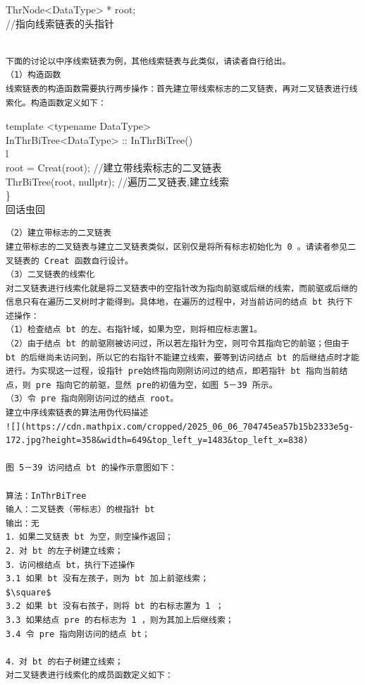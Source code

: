 \documentclass[10pt]{article}
\begin{document}
\begin{verbatim}

\end{verbatim}

ThrNode<DataType> * root;\\
//指向线索链表的头指针

\begin{verbatim}

下面的讨论以中序线索链表为例，其他线索链表与此类似，请读者自行给出。
（1）构造函数
线索链表的构造函数需要执行两步操作：首先建立带线索标志的二叉链表，再对二叉链表进行线索化。构造函数定义如下：
\end{verbatim}

template <typename DataType>\\
InThrBiTree<DataType> :: InThrBiTree()\\
l\\
root = Creat(root); //建立带线索标志的二叉链表\\
ThrBiTree(root, nullptr); //遍历二叉链表,建立线索\\
\}\\
回话虫回

\begin{verbatim}
（2）建立带标志的二叉链表
建立带标志的二叉链表与建立二叉链表类似，区别仅是将所有标志初始化为 0 。请读者参见二叉链表的 Creat 函数自行设计。
（3）二叉链表的线索化
对二叉链表进行线索化就是将二叉链表中的空指针改为指向前驱或后继的线索，而前驱或后继的信息只有在遍历二叉树时才能得到。具体地，在遍历的过程中，对当前访问的结点 bt 执行下述操作：
（1）检查结点 bt 的左、右指针域，如果为空，则将相应标志置1。
（2）由于结点 bt 的前驱刚被访问过，所以若左指针为空，则可令其指向它的前驱；但由于 bt 的后继尚未访问到，所以它的右指针不能建立线索，要等到访问结点 bt 的后继结点时才能进行。为实现这一过程，设指针 pre始终指向刚刚访问过的结点，即若指针 bt 指向当前结点，则 pre 指向它的前驱，显然 pre的初值为空，如图 5－39 所示。
（3）令 pre 指向刚刚访问过的结点 root。
建立中序线索链表的算法用伪代码描述
![](https://cdn.mathpix.com/cropped/2025_06_06_704745ea57b15b2333e5g-172.jpg?height=358&width=649&top_left_y=1483&top_left_x=838)

图 5－39 访问结点 bt 的操作示意图如下：

算法：InThrBiTree
输人：二叉链表（带标志）的根指针 bt
输出：无
1．如果二叉链表 bt 为空，则空操作返回；
2．对 bt 的左子树建立线索；
3．访问根结点 bt，执行下述操作
3.1 如果 bt 没有左孩子，则为 bt 加上前驱线索；
$\square$
3.2 如果 bt 没有右孩子，则将 bt 的右标志置为 1 ；
3.3 如果结点 pre 的右标志为 1 ，则为其加上后继线索；
3.4 令 pre 指向刚访问的结点 bt；

4．对 bt 的右子树建立线索；
对二叉链表进行线索化的成员函数定义如下：
\end{verbatim}
\end{document}
